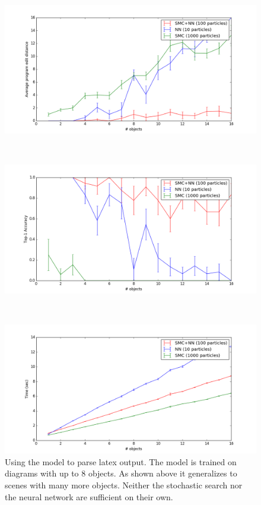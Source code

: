 \documentclass{article}
\begin{document}
\begin{figure}
  \begin{minipage}[t]{15cm}
    \includegraphics[width = 15cm]{figures/editDistance.png}
  \end{minipage}\\
  \begin{minipage}[t]{15cm}
    \includegraphics[width = 15cm]{figures/accuracy.png}
  \end{minipage}\\
  \begin{minipage}[t]{15cm}
    \includegraphics[width = 15cm]{figures/time.png}
  \end{minipage}
  \caption{Using the model to parse latex output. The model is trained on diagrams with up to 8 objects. As shown above it generalizes to scenes with many more objects. Neither the stochastic search nor the neural network are sufficient on their own.}
\end{figure}
\end{document}
